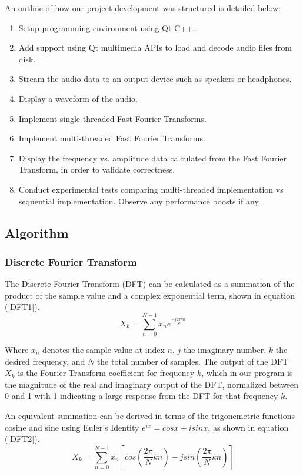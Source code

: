 \documentclass[journal]{IEEEtran}
\begin{document}
\par{
	An outline of how our project development was structured is detailed below:
}
\begin{enumerate}
	\item Setup programming environment using Qt C++.
	\item Add support using Qt multimedia APIs to load and decode audio files from disk.
	\item Stream the audio data to an output device such as speakers or headphones.
	\item Display a waveform of the audio.
	\item Implement single-threaded Fast Fourier Transforms.
	\item Implement multi-threaded Fast Fourier Transforms.
	\item Display the frequency vs. amplitude data calculated from the Fast Fourier Transform, in order to validate correctness.
	\item Conduct experimental tests comparing multi-threaded implementation vs sequential implementation. 
Observe any performance boosts if any.
\end{enumerate}

\subsection{Algorithm}\label{Algorithm}

\subsubsection{Discrete Fourier Transform}
	\par{
		The Discrete Fourier Transform (DFT) can be calculated as 
		a summation of the product of the sample value and a complex
		exponential term, shown in equation (\ref{DFT1}).
	}
		\begin{equation}\label{DFT1}
			\displaystyle X_k = 
			\sum_{n=0}^{N-1}x_ne^{\displaystyle\frac{-j2 \pi kn}{N}}
		\end{equation}
	\par{
		Where $x_n$ denotes the sample value at index $n$, $j$ the imaginary
		number, $k$ the desired frequency, and $N$ the total number of samples.
		The output of the DFT $X_k$ is the Fourier Transform coefficient for
		frequency $k$, which in our program is the magnitude of the real 
		and imaginary output of the DFT, normalized between 0 and 1 with 1
		indicating a large response from the DFT for that frequency $k$.
	}
	\par{
		An equivalent summation can be derived in terms of the trigonemetric
		functions cosine and sine using Euler's Identity $e^{ix}=cosx + isinx$,
		as shown in equation (\ref{DFT2}).
	}
		\begin{equation}\label{DFT2}
			\displaystyle X_k = \sum_{n=0}^{N-1}x_n[cos(\frac{2\pi}{N}kn) 
			- jsin(\frac{2\pi}{N}kn)]
		\end{equation}
\end{document}

